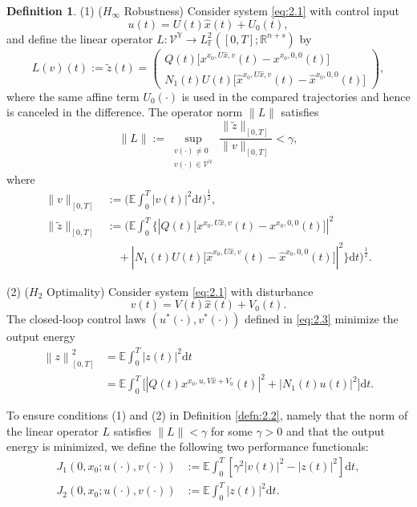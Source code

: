 \documentclass[lettersize,journal]{IEEEtran}
\theoremstyle{plain}
\theoremstyle{definition}
\newtheorem{defn}[thm]{Definition}
\begin{document}
\begin{defn}
	\medskip
	\noindent
	(1) ($H_{\infty}$ Robustness) Consider system \eqref{eq:2.1} with control input
	\[
	u(t)=U(t)\widehat{x}(t)+U_0(t),
	\]
	and define the linear operator $L : \mathcal{V}^{\mathbb{Y}} \rightarrow L_\mathbb{F}^2([0,T];\mathbb{R}^{n + s})$ by
	\[
	L(v)(t) := \widetilde{z}(t) =
	\begin{pmatrix}
		Q(t)\big[x^{x_0,U\widehat{x},v}(t) - x^{x_0,0,0}(t)\big]\\
		N_1(t)U(t)\big[\widehat{x}^{x_0,U\widehat{x},v}(t) - \widehat{x}^{x_0,0,0}(t)\big]
	\end{pmatrix},
	\]
	where the same affine term $U_0(\cdot)$ is used in the compared trajectories and hence is canceled in the difference. The operator norm $\|L\|$ satisfies
	\begin{equation*}
		\|L\| := \sup_{\substack{v(\cdot) \neq 0 \\ v(\cdot) \in \mathcal{V}^{\mathbb{Y}}}} \frac{\|\widetilde{z}\|_{[0,T]}}{\|v\|_{[0,T]}} < \gamma,
	\end{equation*}
	where
	\begin{equation*}
		\begin{aligned}
			\|v\|_{[0,T]} &:= \Big(\mathbb{E}\int_0^T |v(t)|^2 \mathrm{d}t\Big)^{\frac{1}{2}},\\
			\|\widetilde{z}\|_{[0,T]} &:= \Bigg(\mathbb{E}\int_0^T \Big\{|Q(t)\big[x^{x_0,U\widehat{x},v}(t) - x^{x_0,0,0}(t)\big]|^2 \\
			&\quad + |N_1(t)U(t)\big[\widehat{x}^{x_0,U\widehat{x},v}(t) - \widehat{x}^{x_0,0,0}(t)\big]|^2 \Big\} \mathrm{d}t \Bigg)^{\frac{1}{2}}.
		\end{aligned}
	\end{equation*}
	
	\medskip
	\noindent
	(2) ($H_2$ Optimality) Consider system \eqref{eq:2.1} with disturbance
	\[
	v(t) = V(t)\widehat{x}(t) + V_0(t).
	\]
	The closed-loop control laws $(u^*(\cdot),v^*(\cdot))$ defined in \eqref{eq:2.3} minimize the output energy
	\begin{equation*}
		\begin{aligned}
			\left\|z\right\|^2_{[0,T]}
			&= \mathbb{E}\int_{0}^{T} |z(t)|^2 \mathrm{d}t\\
			&= \mathbb{E}\int_{0}^{T} \Big[|Q(t)x^{x_0,u,V\widehat{x}+V_0}(t)|^2 + |N_1(t)u(t)|^2\Big] \mathrm{d}t.
		\end{aligned}
	\end{equation*}
\end{defn}

To ensure conditions (1) and (2) in Definition \ref{defn:2.2}, namely that the norm of the linear operator $L$ satisfies $\|L\| < \gamma$ for some $\gamma > 0$ and that the output energy is minimized, we define the following two performance functionals:
\begin{equation*}
	\begin{aligned}
		J_1(0,x_0;u(\cdot),v(\cdot)) &:= \mathbb{E}\int_{0}^{T} [\gamma^2 |v(t)|^2 - |z(t)|^2]\mathrm{d}t,\\
		J_2(0,x_0;u(\cdot),v(\cdot)) &:= \mathbb{E}\int_{0}^{T} |z(t)|^2 \mathrm{d}t.
	\end{aligned}
\end{equation*}
\end{document}
